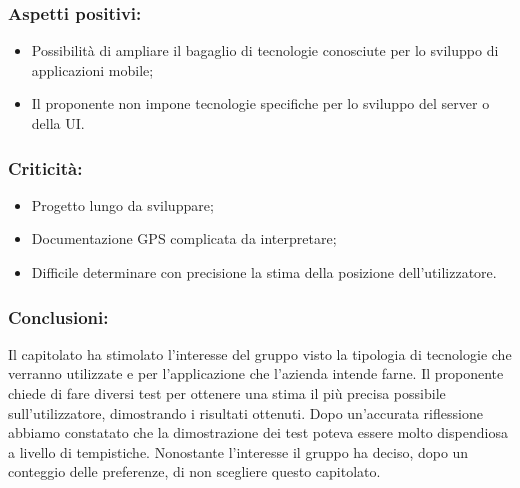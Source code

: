	\subsubsection{Aspetti positivi:}
		\begin{itemize}
			\item Possibilità di ampliare il bagaglio di tecnologie conosciute per lo sviluppo di applicazioni mobile;
			\item Il proponente non impone tecnologie specifiche per lo sviluppo del server o
			della UI.
		\end{itemize}

	\subsubsection{Criticità:}
		\begin{itemize}
			\item Progetto lungo da sviluppare;
			\item Documentazione GPS complicata da interpretare;
			\item Difficile determinare con precisione la stima della posizione dell'utilizzatore.
		\end{itemize}

	\subsubsection{Conclusioni:}
		Il capitolato ha stimolato l'interesse del gruppo visto la tipologia di tecnologie che verranno utilizzate e per l'applicazione che l'azienda intende farne. Il proponente chiede di fare diversi test per ottenere una stima il più precisa possibile sull'utilizzatore, dimostrando i risultati ottenuti. Dopo un'accurata riflessione abbiamo constatato che la dimostrazione dei test poteva essere molto dispendiosa a livello di tempistiche. Nonostante l'interesse il gruppo ha deciso, dopo un conteggio delle preferenze, di non scegliere questo capitolato.
